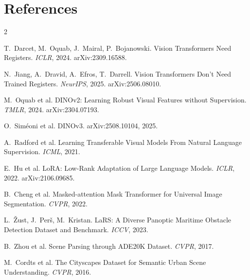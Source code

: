 \documentclass[10pt]{article}
\begin{document}
\section{References}
{\scriptsize\begin{multicols}{2}
\begin{enumerate}[label={[\arabic*]},leftmargin=1.6em]
\item T.~Darcet, M.~Oquab, J.~Mairal, P.~Bojanowski. Vision Transformers Need Registers. \emph{ICLR}, 2024. arXiv:2309.16588.
\item N.~Jiang, A.~Dravid, A.~Efros, T.~Darrell. Vision Transformers Don't Need Trained Registers. \emph{NeurIPS}, 2025. arXiv:2506.08010.
\item M.~Oquab et al. DINOv2: Learning Robust Visual Features without Supervision. \emph{TMLR}, 2024. arXiv:2304.07193.
\item O.~Sim\'eoni et al. DINOv3. arXiv:2508.10104, 2025.
\item A.~Radford et al. Learning Transferable Visual Models From Natural Language Supervision. \emph{ICML}, 2021.
\item E.~Hu et al. LoRA: Low-Rank Adaptation of Large Language Models. \emph{ICLR}, 2022. arXiv:2106.09685.
\item B.~Cheng et al. Masked-attention Mask Transformer for Universal Image Segmentation. \emph{CVPR}, 2022.
\item L.~\v{Z}ust, J.~Per\v{s}, M.~Kristan. LaRS: A Diverse Panoptic Maritime Obstacle Detection Dataset and Benchmark. \emph{ICCV}, 2023.
\item B.~Zhou et al. Scene Parsing through ADE20K Dataset. \emph{CVPR}, 2017.
\item M.~Cordts et al. The Cityscapes Dataset for Semantic Urban Scene Understanding. \emph{CVPR}, 2016.
\end{enumerate}\end{multicols}}
\end{document}
